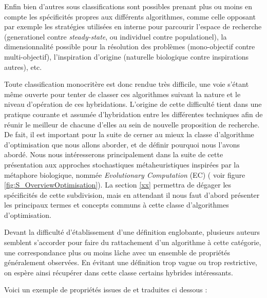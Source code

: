 Enfin bien d'autres sous classifications sont possibles prenant plus ou moins en compte les spécificités propres aux différents algorithmes, comme celle opposant par exemple les stratégies utilisées en interne pour parcourir l'espace de recherche (generationel contre \textit{steady-state}, ou individuel contre populationel), la dimensionnalité possible pour la résolution des problèmes (mono-objectif contre multi-objectif), l'inspiration d'origine (naturelle biologique contre inspirations autres), etc.

Toute classification monocritère est donc rendue très difficile, une voie s'étant même ouverte pour tenter de classer ces algorithmes suivant la nature et le niveau d'opération de ces hybridations. L'origine de cette difficulté tient dans une pratique courante et assumée d'hybridation entre les différentes techniques afin de réunir le meilleur de chacune d'elles au sein de nouvelle proposition de recherche. De fait, il est important pour la suite de cerner au mieux la classe d'algorithme d'optimisation que nous allons aborder, et de définir pourquoi nous l'avons abordé. Nous nous intéresserons principalement dans la suite de cette présentation aux approches stochastiques métaheuristiques inspirées par la métaphore biologique, nommée \textit{Evolutionary Computation} (EC) ( voir figure \ref{fig:S_OverviewOptimisation}). La section \ref{xx} permettra de dégager les spécificités de cette subdivision, mais en attendant il nous faut d'abord présenter les principaux termes et concepts communs à cette classe d'algorithmes d'optimisation.

Devant la difficulté d'établissement d'une définition englobante, plusieurs auteurs semblent s'accorder pour faire du rattachement d'un algorithme à cette catégorie, une correspondance plus ou moins lâche avec un ensemble de propriétés généralement observées. En évitant une définition trop vague ou trop restrictive, on espère ainsi récupérer dans cette classe certains hybrides intéressants.

Voici un exemple de propriétés issues de \textcite{Blum2003} et traduites ci dessous :

